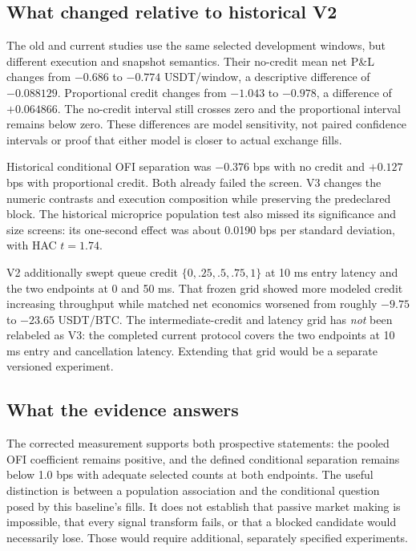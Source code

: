 \subsection{What changed relative to historical V2}

The old and current studies use the same selected development windows, but
different execution and snapshot semantics. Their no-credit mean net P\&L
changes from $-0.686$ to $-0.774$ USDT/window, a descriptive difference of
$-0.088129$. Proportional credit changes from $-1.043$ to $-0.978$, a
difference of $+0.064866$. The no-credit interval still crosses zero and the
proportional interval remains below zero. These differences are model
sensitivity, not paired confidence intervals or proof that either model is
closer to actual exchange fills.

Historical conditional OFI separation was $-0.376$ bps with no credit and
$+0.127$ bps with proportional credit. Both already failed the screen. V3
changes the numeric contrasts and execution composition while preserving the
predeclared block. The historical microprice population test also missed its
significance and size screens: its one-second effect was about 0.0190 bps per
standard deviation, with HAC $t=1.74$.

V2 additionally swept queue credit $\{0,.25,.5,.75,1\}$ at 10 ms entry
latency and the two endpoints at 0 and 50 ms. That frozen grid showed more
modeled credit increasing throughput while matched net economics worsened
from roughly $-9.75$ to $-23.65$ USDT/BTC. The intermediate-credit and latency
grid has \emph{not} been relabeled as V3: the completed current protocol covers
the two endpoints at 10 ms entry and cancellation latency. Extending that grid
would be a separate versioned experiment.

\subsection{What the evidence answers}

The corrected measurement supports both prospective statements: the pooled
OFI coefficient remains positive, and the defined conditional separation
remains below 1.0 bps with adequate selected counts at both endpoints. The
useful distinction is between a population association and the conditional
question posed by this baseline's fills. It does not establish that passive
market making is impossible, that every signal transform fails, or that a
blocked candidate would necessarily lose. Those would require additional,
separately specified experiments.
